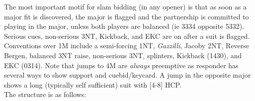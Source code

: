 \documentclass[12pt]{report}
\newcommand{\n}{\\}
\begin{document}
    The most important motif for slam bidding (in any opener) is that as soon as a major fit is discovered, the major is flagged and the partnership is committed to playing in the major, unless both players are balanced (ie 3334 opposite 5332).  Serious cues, non-serious 3NT, Kickback, and EKC are on after a suit is flagged.  \n

    Conventions over 1M include a semi-forcing 1NT, \textit{Gazzilli}, Jacoby 2NT, Reverse Bergen, balanced 3NT raise, non-serious 3NT, splinters, Kickback (1430), and EKC (0314). Note that jumps to 4M are \textit{always} preemptive as responder has several ways to show support and cuebid/keycard.  A jump in the opposite major shows a long (typically self sufficient) suit with [4-8] HCP.  \n

    The structure is as follows:
\end{document}
